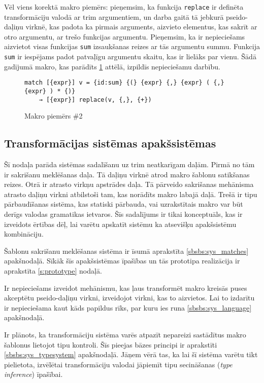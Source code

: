 Vēl viens korektā makro piemērs: pieņemsim, ka funkcija \verb|replace| ir definēta transformāciju valodā ar trim argumentiem, un darba gaitā tā jebkurā pseido-daļiņu virknē, kas padota ka pirmais arguments, aizvieto elementus, kas sakrīt ar otro argumentu, ar trešo funkcijas argumentu. Pieņemsim, ka ir nepieciešams aizvietot visas funkcijas \verb|sum| izsaukšanas reizes ar tās argumentu summu. Funkcija \verb|sum| ir iespējams padot patvaļīgu argumentu skaitu, kas ir lielāks par vienu. Šādā gadījumā makro, kas parādīts \ref{fig:matchsample2} attēlā, izpildīs nepieciešamu darbību.

\begin{figure}[h!]
\begin{verbatim}
match [{expr}] v = {id:sum} {(} {expr} {,} {expr} ( {,} {expr} ) * {)}
    → [{expr}] replace(v, {,}, {+})
\end{verbatim}
\caption{\label{fig:matchsample2}Makro piemērs \#2}
\end{figure}

\subsection{\label{sbs:sys_qualities}Transformācijas sistēmas apakšsistēmas}

Šī nodaļa parāda sistēmas sadalīšanu uz trim neatkarīgam daļām. Pirmā no tām ir sakrišanu meklēšanas daļa. Tā daļiņu virknē atrod makro šablonu satikšanas reizes. Otrā ir atrasto virkņu apstrādes daļa. Tā pārveido sakrišanas mehānisma atrasto daļiņu virkni atbilstoši tam, kas norādīts makro labajā daļā. Trešā ir tipu pārbaudīšanas sistēma, kas statiski pārbauda, vai uzrakstītais makro var būt derīgs valodas gramatikas ietvaros. Šīs sadalījums ir tikai konceptuāls, kas ir izveidots ērtības dēļ, lai varētu apskatīt sistēmu ka atsevišķu apakšsistēmu kombināciju.

Šablonu sakrišanu meklēšanas sistēma ir īsumā aprakstīta \ref{sbsbs:sys_matches} apakšnodaļā. Sīkāk šīs apakšsistēmas īpašības un tās prototipa realizācija ir aprakstīta \ref{s:prototype} nodaļā.

Ir nepieciešams izveidot mehānismu, kas ļaus transformēt makro kreisās puses akceptētu pseido-daļiņu virkni, izveidojot virkni, kas to aizvietos. Lai to izdarītu ir nepieciešama kaut kāds papildus rīks, par kuru ies runa \ref{sbsbs:sys_language} apakšnodaļā.

Ir plānots, ka transformāciju sistēma varēs atpazīt nepareizi sastādītus makro šablonus lietojot tipu kontroli. Šīs pieejas bāzes principi ir aprakstīti \ref{sbsbs:sys_typesystem} apakšnodaļā. Jāņem vērā tas, ka lai šī sistēma varētu tikt pielietota, izvēlētai transformāciju valodai jāpiemīt tipu secināšanas (\emph{type inference}) īpašībai.

